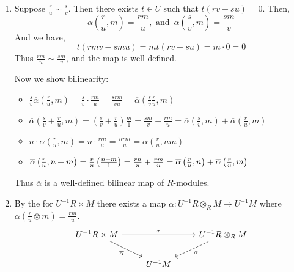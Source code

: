 \documentclass[Notebook.tex]{subfiles}
\begin{document}
\begin{solution}
	\bbni 
	\begin{enumerate}
		\item Suppose $\frac{r}{u} \sim \frac{s}{v}$. Then there exists $t \in U$ such that $t(rv - su) = 0$. Then, 
		\[\overline{\alpha}\left(\frac{r}{u},m\right) = \frac{rm}{u}, \text{ and } \, \overline{\alpha}\left(\frac{s}{v},m\right) = \frac{sm}{v}\]
		And we have, 
		\[t(rmv - smu) = mt(rv - su) = m \cdot 0 = 0\]
		Thus $\frac{rm}{u} \sim  \frac{sm}{v}$, and the map is well-defined. 

		Now we show bilinearity: 
		\begin{itemize}
			\item $\frac{s}{v} \overline{\alpha}\left(\frac{r}{u},m\right) = \frac{s}{v} \cdot \frac{rm}{u} = \frac{srm}{vu} =\overline{\alpha}\left(\frac{s}{v}\frac{r}{u},m\right)$
			\item $\overline{\alpha}\left(\frac{s}{v} + \frac{r}{u},m\right) = \left(\frac{s}{v} + \frac{r}{u}\right)\frac{m}{1} = \frac{sm}{v} + \frac{rm}{u} = \overline{\alpha}\left(\frac{s}{v},m\right) + \overline{\alpha}\left(\frac{r}{u},m\right)$
			\item $n \cdot \overline{\alpha}\left(\frac{r}{u},m\right) = n\cdot \frac{rm}{u} = \frac{nrm}{u} = \overline{\alpha}\left(\frac{r}{u},nm\right)$
			\item $\overline{\alpha}\left(\frac{r}{u},n + m\right) = \frac{r}{u} \left(\frac{n+m}{1}\right) = \frac{rn}{u} + \frac{rm}{u} = \overline{\alpha}\left(\frac{r}{u},n\right) + \overline{\alpha}\left(\frac{r}{u},m\right)$
		\end{itemize}
		Thus $\overline{\alpha}$ is a well-defined bilinear map of $R$-modules. 

		\item By the   for $U^{-1}R \times M$ there exists a map $\alpha: U^{-1}R\otimes_R M \to U^{-1}M$ where $\alpha \left(\frac{r}{u} \otimes m\right) = \frac{rm}{u}$. 
			\[
			\begin{tikzcd}
			U^{-1}R\times M \arrow[rr,"\tau"] \arrow[dr,"\overline{\alpha}"'] & & U^{-1}R\otimes_R M \arrow[dl,dashed,"\alpha"] \\
			& U^{-1}M &
			\end{tikzcd}
			\]


\end{enumerate}
\end{solution}
\end{document}
